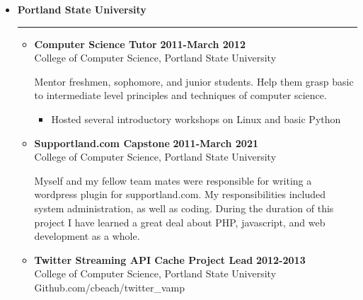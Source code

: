 \documentclass[overlapped]{res}
\begin{document}
\begin{resume}
\begin{itemize}[leftmargin=0in]
    \item[] \textbf{Portland State University} \\[-0.1in] \rule{\textwidth}{0.5pt}
        \begin{itemize}[leftmargin=0in]
            \item[] 
                \begin{samepage}
                    \textbf{Computer Science Tutor} \hfill \textbf{2011-March 2012} \\
                    College of Computer Science, Portland State University \hfill

                    Mentor freshmen, sophomore, and junior students. Help them grasp basic to intermediate level
                    principles and techniques of computer science.	
                    \begin{itemize}
                        \item[\textbullet] Hosted several introductory workshops on Linux and basic Python
                    \end{itemize}
                \end{samepage}

            \item[] 
                \begin{samepage}
                    \textbf{Supportland.com Capstone} \hfill \textbf{2011-March 2021} \\
                    College of Computer Science, Portland State University \hfill

                    Myself and my fellow team mates were responsible for writing a wordpress plugin 
                    for supportland.com. My responsibilities included system administration, as 
                    well as coding. During the duration of this project I have learned a great
                    deal about PHP, javascript, and web development as a whole.
                \end{samepage}

            \item[] 
                \begin{samepage}

                    \textbf{Twitter Streaming API Cache Project Lead} \hfill \textbf{2012-2013} \\
                    College of Computer Science, Portland State University \\
                    Github.com/cbeach/twitter\_vamp 


\end{samepage}
\end{itemize}
\end{itemize}
\end{resume}
\end{document}
